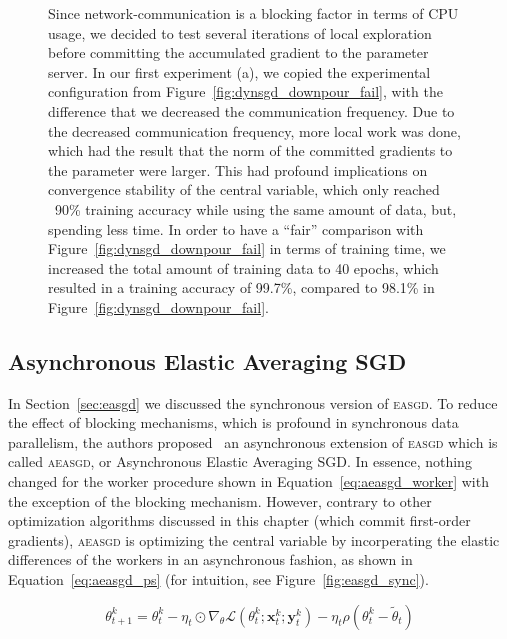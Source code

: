 \begin{figure}[H]
  \caption{Since network-communication is a blocking factor in terms of CPU usage, we decided to test several iterations of local exploration before committing the accumulated gradient to the parameter server. In our first experiment (a), we copied the experimental configuration from Figure~\ref{fig:dynsgd_downpour_fail}, with the difference that we decreased the communication frequency. Due to the decreased communication frequency, more local work was done, which had the result that the norm of the committed gradients to the parameter were larger. This had profound implications on convergence stability of the central variable, which only reached ~90\% training accuracy while using the same amount of data, but, spending less time. In order to have a ``fair'' comparison with Figure~\ref{fig:dynsgd_downpour_fail} in terms of training time, we increased the total amount of training data to 40 epochs, which resulted in a training accuracy of 99.7\%, compared to 98.1\% in Figure~\ref{fig:dynsgd_downpour_fail}.}
  \label{fig:dynsgd_fair}
\end{figure}

\subsection{Asynchronous Elastic Averaging SGD}
\label{sec:aeasgd}

In Section~\ref{sec:easgd} we discussed the synchronous version of \textsc{easgd}. To reduce the effect of blocking mechanisms, which is profound in synchronous data parallelism, the authors proposed~\cite{zhang2015deep} an asynchronous extension of \textsc{easgd} which is called \textsc{aeasgd}, or Asynchronous Elastic Averaging SGD. In essence, nothing changed for the worker procedure shown in Equation~\ref{eq:aeasgd_worker} with the exception of the blocking mechanism. However, contrary to other optimization algorithms discussed in this chapter (which commit first-order gradients), \textsc{aeasgd} is optimizing the central variable by incorperating the elastic differences of the workers in an asynchronous fashion, as shown in Equation~\ref{eq:aeasgd_ps} (for intuition, see Figure~\ref{fig:easgd_sync}).

\begin{equation}
  \label{eq:aeasgd_worker}
  \theta^k_{t+1} = \theta^k_t - \eta_t \odot \nabla_\theta \mathcal{L}(\theta^k_t;\mathbf{x}^k_t;\mathbf{y}^k_t) - \eta_t\rho(\theta^k_t - \tilde{\theta}_t)
\end{equation}

